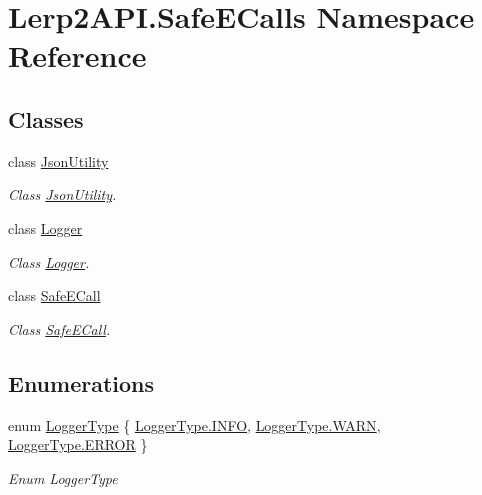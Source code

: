 \hypertarget{namespace_lerp2_a_p_i_1_1_safe_e_calls}{}\section{Lerp2\+A\+P\+I.\+Safe\+E\+Calls Namespace Reference}
\label{namespace_lerp2_a_p_i_1_1_safe_e_calls}
\subsection*{Classes}
\begin{DoxyCompactItemize}
\item 
class \hyperlink{class_lerp2_a_p_i_1_1_safe_e_calls_1_1_json_utility}{Json\+Utility}
\begin{DoxyCompactList}\small\item\em Class \hyperlink{class_lerp2_a_p_i_1_1_safe_e_calls_1_1_json_utility}{Json\+Utility}. \end{DoxyCompactList}\item 
class \hyperlink{class_lerp2_a_p_i_1_1_safe_e_calls_1_1_logger}{Logger}
\begin{DoxyCompactList}\small\item\em Class \hyperlink{class_lerp2_a_p_i_1_1_safe_e_calls_1_1_logger}{Logger}. \end{DoxyCompactList}\item 
class \hyperlink{class_lerp2_a_p_i_1_1_safe_e_calls_1_1_safe_e_call}{Safe\+E\+Call}
\begin{DoxyCompactList}\small\item\em Class \hyperlink{class_lerp2_a_p_i_1_1_safe_e_calls_1_1_safe_e_call}{Safe\+E\+Call}. \end{DoxyCompactList}\end{DoxyCompactItemize}
\subsection*{Enumerations}
\begin{DoxyCompactItemize}
\item 
enum \hyperlink{namespace_lerp2_a_p_i_1_1_safe_e_calls_a6a0ca549f40345fd248d66346dfe1d70}{Logger\+Type} \{ \hyperlink{namespace_lerp2_a_p_i_1_1_safe_e_calls_a6a0ca549f40345fd248d66346dfe1d70a551b723eafd6a31d444fcb2f5920fbd3}{Logger\+Type.\+I\+N\+FO}, 
\hyperlink{namespace_lerp2_a_p_i_1_1_safe_e_calls_a6a0ca549f40345fd248d66346dfe1d70a32bd8a1db2275458673903bdb84cb277}{Logger\+Type.\+W\+A\+RN}, 
\hyperlink{namespace_lerp2_a_p_i_1_1_safe_e_calls_a6a0ca549f40345fd248d66346dfe1d70abb1ca97ec761fc37101737ba0aa2e7c5}{Logger\+Type.\+E\+R\+R\+OR}
 \}\begin{DoxyCompactList}\small\item\em Enum Logger\+Type \end{DoxyCompactList}
\end{DoxyCompactItemize}


